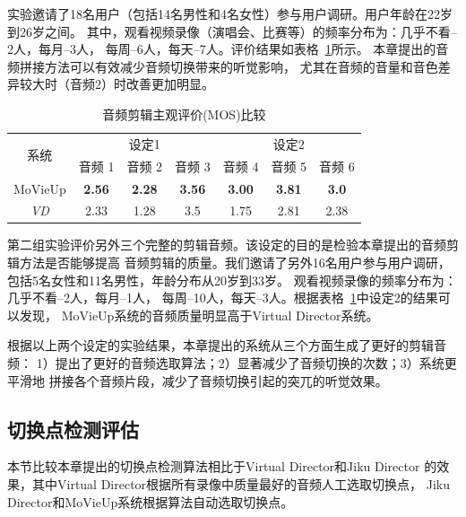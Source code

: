 \documentclass[doctor]{ustcthesis}
\begin{document}
实验邀请了18名用户（包括14名男性和4名女性）参与用户调研。用户年龄在22岁到26岁之间。
其中，观看视频录像（演唱会、比赛等）的频率分布为：几乎不看--2人，每月--3人，
每周--6人，每天--7人。评价结果如表格~\ref{tab:mashup-audio-eval}所示。
本章提出的音频拼接方法可以有效减少音频切换带来的听觉影响，
尤其在音频的音量和音色差异较大时（音频2）时改善更加明显。
\begin{table}[htpb]
    \centering
    \caption{音频剪辑主观评价(MOS)比较}
    \label{tab:mashup-audio-eval}
    \begin{tabular}{|c|c|c|c|c|c|c|}
        \hline
        \multirow{2}{*}{系统} & \multicolumn{3}{c|}{设定1} &
        \multicolumn{3}{c|}{设定2}\\
        \cline{2-7}
        & 音频 1& 音频 2 & 音频 3 & 音频 4 & 音频 5 & 音频 6 \\
        \hline
        MoVieUp &\textbf{2.56} &\textbf{2.28} & \textbf{3.56} & \textbf{3.00} & \textbf{3.81}& \textbf{3.0} \\
        \emph{VD} &2.33 & 1.28 & 3.5 & 1.75 & 2.81 & 2.38 \\
        \hline
    \end{tabular}
\end{table}

第二组实验评价另外三个完整的剪辑音频。该设定的目的是检验本章提出的音频剪辑方法是否能够提高
音频剪辑的质量。我们邀请了另外16名用户参与用户调研，包括5名女性和11名男性，年龄分布从20岁到33岁。
观看视频录像的频率分布为：几乎不看--2人，每月--1人，
每周--10人，每天--3人。根据表格~\ref{tab:mashup-audio-eval}中设定2的结果可以发现，
MoVieUp系统的音频质量明显高于Virtual Director系统。

根据以上两个设定的实验结果，本章提出的系统从三个方面生成了更好的剪辑音频：
1）提出了更好的音频选取算法；2）显著减少了音频切换的次数；3）系统更平滑地
拼接各个音频片段，减少了音频切换引起的突兀的听觉效果。

\subsection{切换点检测评估}
本节比较本章提出的切换点检测算法相比于Virtual Director和Jiku Director
的效果，其中Virtual Director根据所有录像中质量最好的音频人工选取切换点，
Jiku Director和MoVieUp系统根据算法自动选取切换点。
\end{document}
